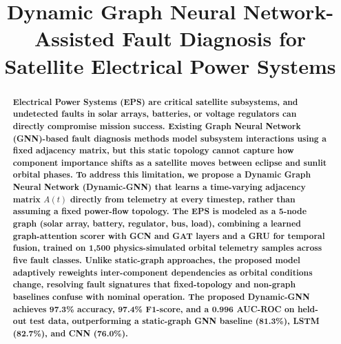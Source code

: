 \documentclass[conference]{IEEEtran}
\begin{document}
\title{Dynamic Graph Neural Network-Assisted Fault Diagnosis for Satellite Electrical Power Systems}

\author{
\and
{}
\and
{}
}

\maketitle

\begin{abstract}
\textbf{Electrical Power Systems (EPS) are critical satellite subsystems, and undetected faults
in solar arrays, batteries, or voltage regulators can directly compromise mission success.
Existing Graph Neural Network (GNN)-based fault diagnosis methods model subsystem
interactions using a fixed adjacency matrix, but this static topology cannot capture how
component importance shifts as a satellite moves between eclipse and sunlit orbital phases.
To address this limitation, we propose a Dynamic Graph Neural Network (Dynamic-GNN) that
learns a time-varying adjacency matrix $A(t)$ directly from telemetry at every timestep, rather
than assuming a fixed power-flow topology. The EPS is modeled as a 5-node graph (solar array,
battery, regulator, bus, load), combining a learned graph-attention scorer with GCN and GAT
layers and a GRU for temporal fusion, trained on 1,500 physics-simulated orbital telemetry
samples across five fault classes. Unlike static-graph approaches, the proposed model
adaptively reweights inter-component dependencies as orbital conditions change, resolving
fault signatures that fixed-topology and non-graph baselines confuse with nominal operation.
The proposed Dynamic-GNN achieves 97.3\% accuracy, 97.4\% F1-score, and a 0.996 AUC-ROC on
held-out test data, outperforming a static-graph GNN baseline (81.3\%), LSTM (82.7\%), and CNN
(76.0\%).}
\end{abstract}
\end{document}
